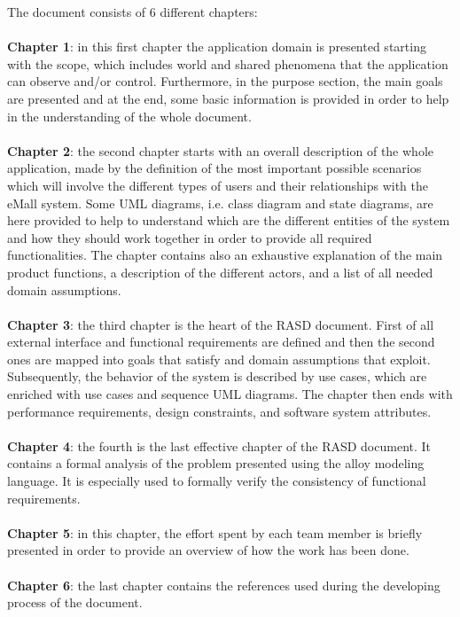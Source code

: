 \documentclass[a4paper]{report}
\begin{document}
The document consists of 6 different chapters:
\\
\\
\textbf{Chapter 1}: in this first chapter the application domain is presented starting with the scope, which includes world and shared phenomena that the application can observe and/or control. Furthermore, in the purpose section, the main goals are presented and at the end, some basic information is provided in order to help in the understanding of the whole document.\\ \\
\textbf{Chapter 2}: the second chapter starts with an overall description of the whole application, made by the definition of the most important possible scenarios which will involve the different types of users and their relationships with the eMall system. Some UML diagrams, i.e. class diagram and state diagrams, are here provided to help to understand which are the different entities of the system and how they should work together in order to provide all required functionalities. The chapter contains also an exhaustive explanation of the main product functions, a description of the different actors, and a list of all needed domain assumptions.\\ \\
\textbf{Chapter 3}: the third chapter is the heart of the RASD document. First of all external interface and functional requirements are defined and then the second ones are mapped into goals that satisfy and domain assumptions that exploit. Subsequently, the behavior of the system is described by use cases, which are enriched with use cases and sequence UML diagrams. The chapter then ends with performance requirements, design constraints, and software system attributes.\\ \\
\textbf{Chapter 4}: the fourth is the last effective chapter of the RASD document. It contains a formal analysis of the problem presented using the alloy modeling language. It is especially used to formally verify the consistency of functional requirements.\\ \\
\textbf{Chapter 5}: in this chapter, the effort spent by each team member is briefly presented in order to provide an overview of how the work has been done.\\ \\
\textbf{Chapter 6}: the last chapter contains the references used during the developing process of the document.
\end{document}
